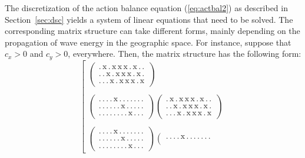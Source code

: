 \documentclass[12pt]{book}
\begin{document}
The discretization of the action balance equation (\ref{eq:actbal2}) as described in Section~\ref{sec:dsc} yields
a system of linear equations that need to be solved. The corresponding matrix structure can
take different forms, mainly depending on the propagation of wave energy in the geographic space. For instance,
suppose that $c_x > 0$ and $c_y > 0$, everywhere. Then, the matrix structure has the following form:
\begin{equation}
  \left[
    \begin{array}{l}
       \left(
         \begin{array}{l}
            \mathrm{.\, x\, .\, x\, x\, x\, .\, x\, .\, .\,} \\
            \mathrm{.\, .\, x\, .\, x\, x\, x\, .\, x\, .\,} \\
            \mathrm{.\, .\, .\, x\, .\, x\, x\, x\, .\, x\,}
         \end{array}
       \right)\\
       \\
       \left(
         \begin{array}{l}
            \mathrm{.\,.\, .\, .\, x\, .\, .\, .\, .\, .\, .\,.\,} \\
            \mathrm{.\,.\, .\, .\, .\, .\, x\, .\, .\, .\, .\,.\,} \\
            \mathrm{.\,.\, .\, .\, .\, .\, .\, .\, x\, .\, .\,.\,}
         \end{array}
       \right)
       \left(
         \begin{array}{l}
            \mathrm{.\, x\, .\, x\, x\, x\, .\, x\, .\, .\,} \\
            \mathrm{.\, .\, x\, .\, x\, x\, x\, .\, x\, .\,} \\
            \mathrm{.\, .\, .\, x\, .\, x\, x\, x\, .\, x\,}
         \end{array}
       \right)\\
       \\
       \left(
         \begin{array}{l}
            \mathrm{.\,.\, .\, .\, x\, .\, .\, .\, .\, .\, .\,.\,} \\
            \mathrm{.\,.\, .\, .\, .\, .\, x\, .\, .\, .\, .\,.\,} \\
            \mathrm{.\,.\, .\, .\, .\, .\, .\, .\, x\, .\, .\,.\,}
         \end{array}
       \right)
       \left(
         \begin{array}{l}
            \mathrm{.\,.\, .\, .\, x\, .\, .\, .\, .\, .\, .\,.\,} \\

\end{array}
\end{array}
\end{equation}
\end{document}
